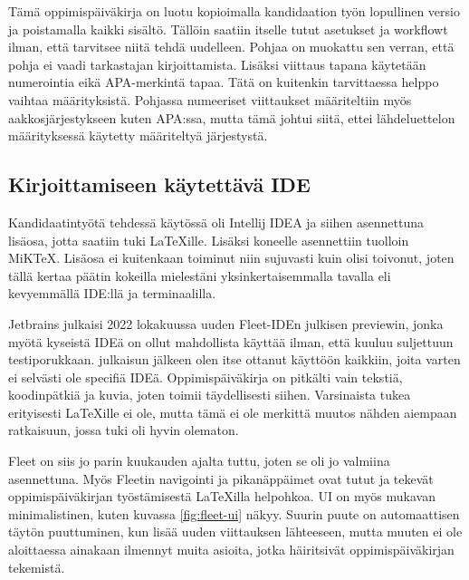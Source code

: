 Tämä oppimispäiväkirja on luotu kopioimalla kandidaation työn lopullinen
versio ja poistamalla kaikki sisältö. Tällöin saatiin itselle tutut asetukset
ja workflowt ilman, että tarvitsee niitä tehdä uudelleen. Pohjaa on muokattu
sen verran, että pohja ei vaadi tarkastajan kirjoittamista. Lisäksi viittaus
tapana käytetään numerointia eikä APA-merkintä tapaa. Tätä on kuitenkin
tarvittaessa helppo vaihtaa määrityksistä. Pohjassa numeeriset viittaukset
määriteltiin myös aakkosjärjestykseen kuten APA:ssa, mutta tämä johtui siitä,
ettei lähdeluettelon määrityksessä käytetty määriteltyä järjestystä.

\subsection{Kirjoittamiseen käytettävä IDE}

Kandidaatintyötä tehdessä käytössä oli Intellij IDEA ja siihen asennettuna
lisäosa, jotta saatiin tuki LaTeXille. Lisäksi koneelle asennettiin tuolloin
MiKTeX. Lisäosa ei kuitenkaan toiminut niin sujuvasti kuin olisi toivonut,
joten tällä kertaa päätin kokeilla mielestäni yksinkertaisemmalla tavalla eli
kevyemmällä IDE:llä ja terminaalilla.

Jetbrains julkaisi \parencite{JetbrainsFleetPublicPreview} 2022 lokakuussa
uuden Fleet-IDEn julkisen previewin, jonka myötä kyseistä IDEä on ollut
mahdollista käyttää ilman, että kuuluu suljettuun testiporukkaan. julkaisun
jälkeen olen itse ottanut käyttöön kaikkiin, joita varten ei selvästi ole
specifiä IDEä. Oppimispäiväkirja on pitkälti vain tekstiä, koodinpätkiä ja
kuvia, joten toimii täydellisesti siihen. Varsinaista tukea erityisesti
LaTeXille ei ole, mutta tämä ei ole merkittä muutos nähden aiempaan ratkaisuun,
jossa tuki oli hyvin olematon.

Fleet on siis jo parin kuukauden ajalta tuttu, joten se oli jo valmiina
asennettuna. Myös Fleetin navigointi ja pikanäppäimet ovat tutut ja tekevät
oppimispäiväkirjan työstämisestä LaTeXilla helpohkoa. UI on myös mukavan
minimalistinen, kuten kuvassa \ref{fig:fleet-ui} näkyy. Suurin puute on
automaattisen täytön puuttuminen, kun lisää uuden viittauksen lähteeseen,
mutta muuten ei ole aloittaessa ainakaan ilmennyt muita asioita, jotka
häiritsivät oppimispäiväkirjan tekemistä.

